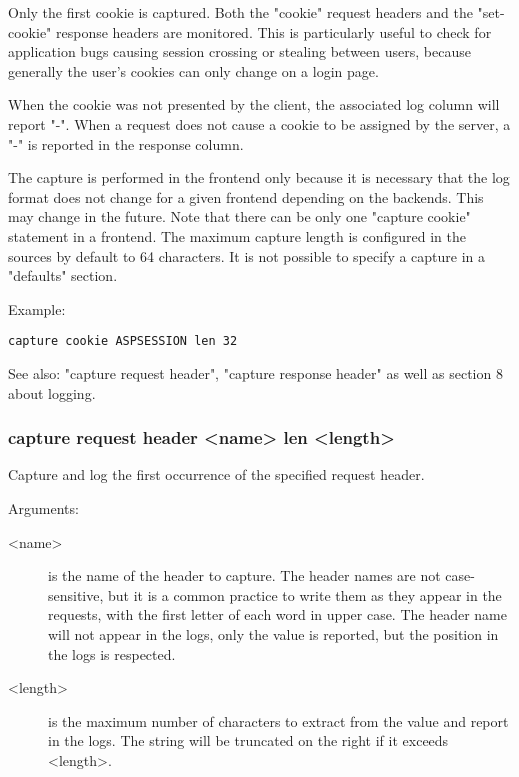   Only the first cookie is captured. Both the "cookie" request headers and the
  "set-cookie" response headers are monitored. This is particularly useful to
  check for application bugs causing session crossing or stealing between
  users, because generally the user's cookies can only change on a login page.

  When the cookie was not presented by the client, the associated log column
  will report "-". When a request does not cause a cookie to be assigned by the
  server, a "-" is reported in the response column.

  The capture is performed in the frontend only because it is necessary that
  the log format does not change for a given frontend depending on the
  backends. This may change in the future. Note that there can be only one
  "capture cookie" statement in a frontend. The maximum capture length is
  configured in the sources by default to 64 characters. It is not possible to
  specify a capture in a "defaults" section.

  Example:

  \verb|capture cookie ASPSESSION len 32|

  See also: "capture request header", "capture response header" as well as
            section 8 about logging.

\subsubsection[capture request header]{capture request header <name> len <length>}
  
  Capture and log the first occurrence of the specified request header.

  
  Arguments:
  \begin{description}
  \item[<name>]    is the name of the header to capture. The header names are not
              case-sensitive, but it is a common practice to write them as they
              appear in the requests, with the first letter of each word in
              upper case. The header name will not appear in the logs, only the
              value is reported, but the position in the logs is respected.

  \item[<length>]  is the maximum number of characters to extract from the value and
              report in the logs. The string will be truncated on the right if
              it exceeds <length>.
  \end{description}

